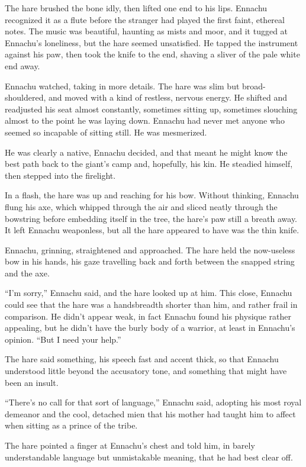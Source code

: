 The hare brushed the bone idly, then lifted one end to his lips. Ennachu recognized it as a flute before the stranger had played the first faint, ethereal notes. The music was beautiful, haunting as mists and moor, and it tugged at Ennachu's loneliness, but the hare seemed unsatisfied. He tapped the instrument against his paw, then took the knife to the end, shaving a sliver of the pale white end away.

Ennachu watched, taking in more details. The hare was slim but broad-shouldered, and moved with a kind of restless, nervous energy. He shifted and readjusted his seat almost constantly, sometimes sitting up, sometimes slouching almost to the point he was laying down. Ennachu had never met anyone who seemed so incapable of sitting still. He was mesmerized.

He was clearly a native, Ennachu decided, and that meant he might know the best path back to the giant's camp and, hopefully, his kin. He steadied himself, then stepped into the firelight.

In a flash, the hare was up and reaching for his bow. Without thinking, Ennachu flung his axe, which whipped through the air and sliced neatly through the bowstring before embedding itself in the tree, the hare's paw still a breath away. It left Ennachu weaponless, but all the hare appeared to have was the thin knife.

Ennachu, grinning, straightened and approached. The hare held the now-useless bow in his hands, his gaze travelling back and forth between the snapped string and the axe.

``I'm sorry,'' Ennachu said, and the hare looked up at him. This close, Ennachu could see that the hare was a handsbreadth shorter than him, and rather frail in comparison. He didn't appear weak, in fact Ennachu found his physique rather appealing, but he didn't have the burly body of a warrior, at least in Ennachu's opinion. ``But I need your help.''

The hare said something, his speech fast and accent thick, so that Ennachu understood little beyond the accusatory tone, and something that might have been an insult.

``There's no call for that sort of language,'' Ennachu said, adopting his most royal demeanor and the cool, detached mien that his mother had taught him to affect when sitting as a prince of the tribe.

The hare pointed a finger at Ennachu's chest and told him, in barely understandable language but unmistakable meaning, that he had best clear off.

